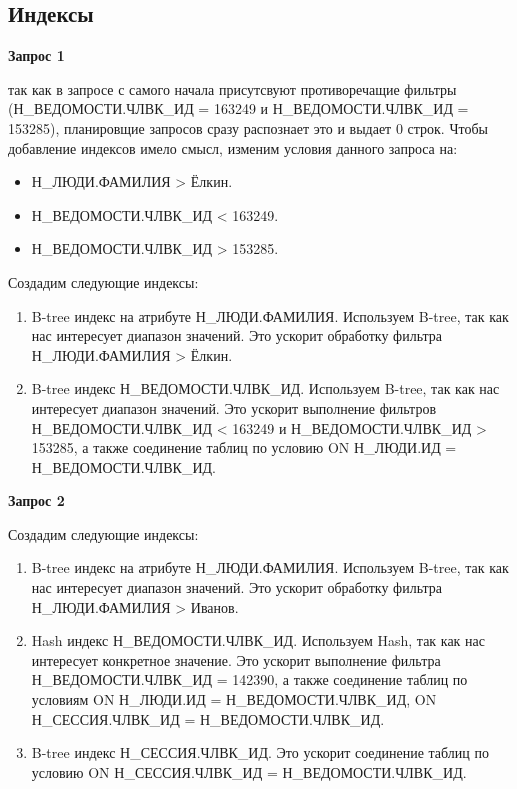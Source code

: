 \documentclass[14pt,final,oneside]{extreport}%
\begin{document}
    

    \subsection{Индексы}

    \textbf{Запрос 1}

    так как в запросе с самого начала присутсвуют противоречащие фильтры (Н{\_}ВЕДОМОСТИ.ЧЛВК{\_}ИД = 163249 и Н{\_}ВЕДОМОСТИ.ЧЛВК{\_}ИД = 153285),
    планировщие запросов сразу распознает это и выдает 0 строк. Чтобы добавление индексов имело смысл, изменим условия данного запроса на: 
    \begin{itemize}
            \item Н{\_}ЛЮДИ.ФАМИЛИЯ > Ёлкин.
            \item Н{\_}ВЕДОМОСТИ.ЧЛВК{\_}ИД < 163249.
            \item Н{\_}ВЕДОМОСТИ.ЧЛВК{\_}ИД > 153285.
    \end{itemize}

    Создадим следующие индексы:
    \begin{enumerate}
        \item B-tree индекс на атрибуте Н{\_}ЛЮДИ.ФАМИЛИЯ. Используем B-tree, так как нас интересует диапазон значений.
         Это ускорит обработку фильтра Н{\_}ЛЮДИ.ФАМИЛИЯ > Ёлкин.
        \item B-tree индекс Н{\_}ВЕДОМОСТИ.ЧЛВК{\_}ИД. Используем B-tree, так как нас интересует диапазон значений.
         Это ускорит выполнение фильтров 
            Н{\_}ВЕДОМОСТИ.ЧЛВК{\_}ИД < 163249 и Н{\_}ВЕДОМОСТИ.ЧЛВК{\_}ИД > 153285, 
            а также соединение таблиц по условию ON Н{\_}ЛЮДИ.ИД = Н{\_}ВЕДОМОСТИ.ЧЛВК{\_}ИД.
    \end{enumerate}

    \textbf{Запрос 2}

    Создадим следующие индексы:
    \begin{enumerate}
        \item B-tree индекс на атрибуте Н{\_}ЛЮДИ.ФАМИЛИЯ. Используем B-tree, так как нас интересует диапазон значений.
         Это ускорит обработку фильтра Н{\_}ЛЮДИ.ФАМИЛИЯ > Иванов.
        \item Hash индекс Н{\_}ВЕДОМОСТИ.ЧЛВК{\_}ИД. Используем Hash, так как нас интересует конкретное значение.
         Это ускорит выполнение фильтра Н{\_}ВЕДОМОСТИ.ЧЛВК{\_}ИД = 142390, а также соединение таблиц по условиям ON Н{\_}ЛЮДИ.ИД = Н{\_}ВЕДОМОСТИ.ЧЛВК{\_}ИД, 
         ON Н{\_}СЕССИЯ.ЧЛВК{\_}ИД = Н{\_}ВЕДОМОСТИ.ЧЛВК{\_}ИД.
         \item B-tree индекс Н{\_}СЕССИЯ.ЧЛВК{\_}ИД.
         Это ускорит соединение таблиц по условию ON Н{\_}СЕССИЯ.ЧЛВК{\_}ИД = Н{\_}ВЕДОМОСТИ.ЧЛВК{\_}ИД.
    \end{enumerate}
\end{document}
